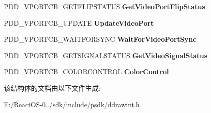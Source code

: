 \begin{DoxyCompactItemize}
\mbox{\label{struct_d_d___v_i_d_e_o_p_o_r_t_c_a_l_l_b_a_c_k_s_a9915bca5f4f688ee952fcf11d0d29594}} 
P\+D\+D\+\_\+\+V\+P\+O\+R\+T\+C\+B\+\_\+\+G\+E\+T\+F\+L\+I\+P\+S\+T\+A\+T\+US {\bfseries Get\+Video\+Port\+Flip\+Status}
\item 
\mbox{\label{struct_d_d___v_i_d_e_o_p_o_r_t_c_a_l_l_b_a_c_k_s_ad9d9d81a7884c391f7c4bb9bc19a00a1}} 
P\+D\+D\+\_\+\+V\+P\+O\+R\+T\+C\+B\+\_\+\+U\+P\+D\+A\+TE {\bfseries Update\+Video\+Port}
\item 
\mbox{\label{struct_d_d___v_i_d_e_o_p_o_r_t_c_a_l_l_b_a_c_k_s_a9610b9f44ebf815e481006cf46a70a90}} 
P\+D\+D\+\_\+\+V\+P\+O\+R\+T\+C\+B\+\_\+\+W\+A\+I\+T\+F\+O\+R\+S\+Y\+NC {\bfseries Wait\+For\+Video\+Port\+Sync}
\item 
\mbox{\label{struct_d_d___v_i_d_e_o_p_o_r_t_c_a_l_l_b_a_c_k_s_a60134b1078e3abe908f97269e533bdb5}} 
P\+D\+D\+\_\+\+V\+P\+O\+R\+T\+C\+B\+\_\+\+G\+E\+T\+S\+I\+G\+N\+A\+L\+S\+T\+A\+T\+US {\bfseries Get\+Video\+Signal\+Status}
\item 
\mbox{\label{struct_d_d___v_i_d_e_o_p_o_r_t_c_a_l_l_b_a_c_k_s_ae6d3dad94b31396ec8d9719826dcdf8a}} 
P\+D\+D\+\_\+\+V\+P\+O\+R\+T\+C\+B\+\_\+\+C\+O\+L\+O\+R\+C\+O\+N\+T\+R\+OL {\bfseries Color\+Control}
\end{DoxyCompactItemize}


该结构体的文档由以下文件生成\+:\begin{DoxyCompactItemize}
\item 
E\+:/\+React\+O\+S-\/0../sdk/include/psdk/ddrawint.\+h\end{DoxyCompactItemize}
